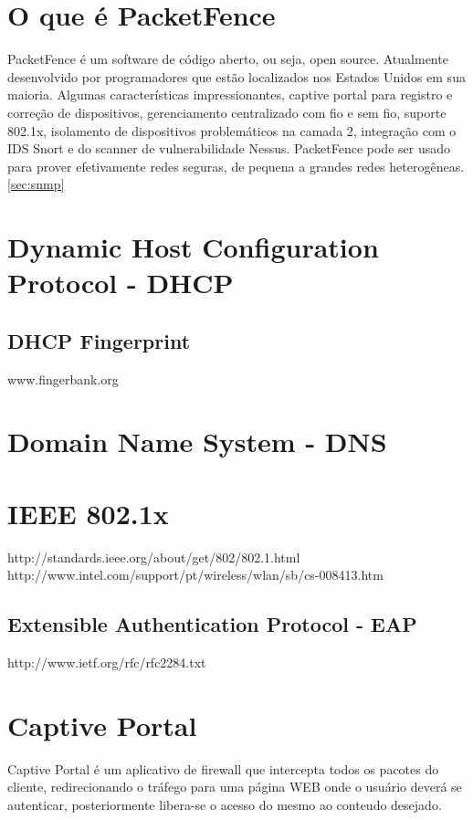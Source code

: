 \documentclass[12pt, brazil, ruledheader, pnumromarab,normaltoc]{abnt}
\begin{document}
\section{O que é PacketFence}
PacketFence \cite{url-pf} é um software de código aberto, ou seja, open source. Atualmente desenvolvido por programadores que estão localizados nos Estados Unidos em sua maioria. Algumas características impressionantes, captive portal para registro e correção de dispositivos, gerenciamento centralizado com fio e sem fio, suporte 802.1x, isolamento de dispositivos problemáticos na camada 2, integração com o IDS Snort e do scanner de vulnerabilidade Nessus. PacketFence pode ser usado para prover efetivamente redes seguras, de pequena a grandes redes heterogêneas. \ref{sec:snmp}

\section{Dynamic Host Configuration Protocol - DHCP}

\subsection{DHCP Fingerprint}\label{sec:dhcp}
www.fingerbank.org

\section{Domain Name System - DNS}

\section{IEEE 802.1x}\label{sec:802.1x}
http://standards.ieee.org/about/get/802/802.1.html
http://www.intel.com/support/pt/wireless/wlan/sb/cs-008413.htm

\subsection{Extensible Authentication Protocol - EAP}
http://www.ietf.org/rfc/rfc2284.txt

\section{Captive Portal}\label{sec:captive}
Captive Portal \cite{captive} é um aplicativo de firewall que intercepta todos os pacotes do cliente, redirecionando o tráfego para uma página WEB onde o usuário deverá se autenticar, posteriormente libera-se o acesso do mesmo ao conteudo desejado.
\end{document}
